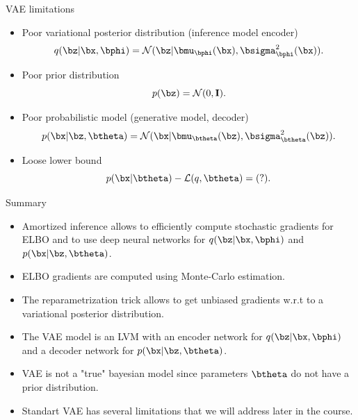 \begin{frame}{VAE limitations}
	\begin{itemize}
		\item Poor variational posterior distribution (inference model encoder)
		\[
		q(\bz | \bx, \bphi) = \mathcal{N}(\bz| \bmu_{\bphi}(\bx), \bsigma^2_{\bphi}(\bx)).
		\]
		\item Poor prior distribution
		\[
		p(\bz) = \mathcal{N}(0, \mathbf{I}).
		\]
		\item Poor probabilistic model (generative model, decoder)
		\[
		p(\bx | \bz, \btheta) = \mathcal{N}(\bx| \bmu_{\btheta}(\bz), \bsigma^2_{\btheta}(\bz)).
		\]
		\item Loose lower bound
		\[
		p(\bx | \btheta) - \mathcal{L}(q, \btheta) = (?).
		\]
	\end{itemize}
\end{frame}
\begin{frame}{Summary}
	\begin{itemize}
		\item Amortized inference allows to efficiently compute stochastic gradients for ELBO and to use deep neural networks for $q(\bz | \bx, \bphi)$ and $p(\bx | \bz, \btheta)$.
		\vfill
		\item ELBO gradients are computed using Monte-Carlo estimation.
		\vfill
		\item The reparametrization trick allows to get unbiased gradients w.r.t to a variational posterior distribution.
		\vfill
		\item The VAE model is an LVM with an encoder network for $q(\bz | \bx, \bphi)$ and a decoder network for $p(\bx | \bz, \btheta)$.
		\vfill
		\item VAE is not a "true" bayesian model since parameters $\btheta$ do not have a prior distribution.
		\vfill
		\item Standart VAE has several limitations that we will address later in the course.
	\end{itemize}
\end{frame}
 